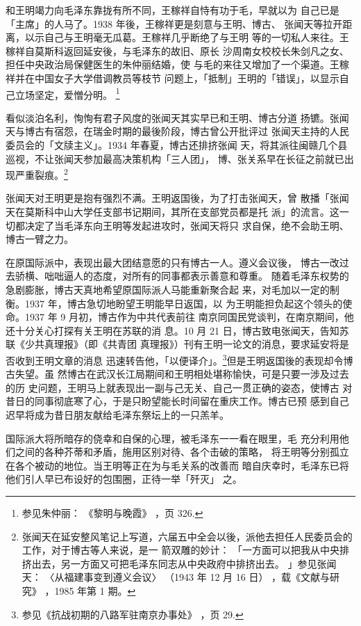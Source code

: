 和王明竭力向毛泽东靠拢有所不同，王稼祥自恃有功于毛，早就以为
自己已是「主席」的人马了。1938 年後，王稼祥更是刻意与王明、博古、
张闻天等拉开距离，以示自己与王明毫无瓜葛。王稼祥几乎断绝了与王明
等的一切私人来往。王稼祥自莫斯科返回延安後，与毛泽东的故旧、原长
沙周南女校校长朱剑凡之女、担任中央政治局保健医生的朱仲丽结婚，使
与毛的来往又增加了一个渠道。王稼祥并在中国女子大学借调教员等枝节
问题上，「抵制」王明的「错误」，以显示自己立场坚定，爱憎分明。
\footnote{参见朱仲丽：
《黎明与晚霞》
，页 326. 
}

看似淡泊名利，恂恂有君子风度的张闻天其实早已和王明、博古分道
扬镳。张闻天与博古有宿怨，在瑞金时期的最後阶段，博古曾公开批评过
张闻天主持的人民委员会的「文牍主义」。1934 年春夏，博古还排挤张闻
天，将其派往闽赣几个县巡视，不让张闻天参加最高决策机构「三人团」，
博、张关系早在长征之前就已出现严重裂痕。\footnote{张闻天在延安整风笔记上写道，六届五中全会以後，派他去担任人民委员会的工作，对于博古等人来说，是一
箭双雕的妙计：
「一方面可以把我从中央排挤出去，另一方面又可把毛泽东同志从中央政府中排挤出去。
」参见张闻天：
〈从福建事变到遵义会议〉
（1943 年 12 月 16 日）
，载《文献与研究》
，1985 年第 1 期。
}

张闻天对王明更是抱有强烈不满。王明返国後，为了打击张闻天，曾
散播「张闻天在莫斯科中山大学任支部书记期间，其所在支部党员都是托
派」的流言。这一切都决定了当毛泽东向王明等发起进攻时，张闻天将只
求自保，绝不会助王明、博古一臂之力。

在原国际派中，表现出最大团结意愿的只有博古一人。遵义会议後，
博古一改过去骄横、咄咄逼人的态度，对所有的同事都表示善意和尊重。
随着毛泽东权势的急剧膨胀，博古天真地希望原国际派人马能重新聚合起
来，对毛加以一定的制衡。1937 年，博古急切地盼望王明能早日返国，以
为王明能担负起这个领头的使命。1937 年 9 月初，博古作为中共代表前往
南京同国民党谈判，在南京期间，他还十分关心打探有关王明在苏联的消
息。10 月 21 日，博古致电张闻天，告知苏联《少共真理报》（即《共青团
真理报》）刊有王明一论文的消息，要求延安将是否收到王明文章的消息
迅速转告他，「以便译介」。\footnote{ 参见《抗战初期的八路军驻南京办事处》
，页 29.}但是王明返国後的表现却令博古失望。虽
然博古在武汉长江局期间和王明相处堪称愉快，可是只要一涉及过去的历
史问题，王明马上就表现出一副与己无关、自己一贯正确的姿态，使博古
对昔日的同事彻底寒了心，于是只盼望能长时间留在重庆工作。博古已预
感到自己迟早将成为昔日朋友献给毛泽东祭坛上的一只羔羊。

国际派大将所暗存的侥幸和自保的心理，被毛泽东一一看在眼里，毛
充分利用他们之间的各种芥蒂和矛盾，施用区别对待、各个击破的策略，
将王明等分别孤立在各个被动的地位。当王明等正在为与毛关系的改善而
暗自庆幸时，毛泽东已将他们引人早已布设好的包围圈，正待一举「歼灭」
之。

